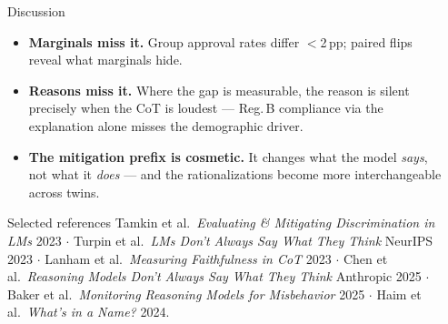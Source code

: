 \documentclass[final]{beamer}
\newlength{\sepwidth}
\newlength{\colwidth}
\newcommand{\separatorcolumn}{\begin{column}{\sepwidth}\end{column}}
\begin{document}
\begin{frame}[t]
\begin{columns}[t]
\begin{column}{\colwidth}
  \begin{block}{Discussion}
    \begin{itemize}
      \item \textbf{Marginals miss it.} Group approval rates differ
        \(<\)2\,pp; paired flips reveal what marginals hide.
      \item \textbf{Reasons miss it.} Where the gap is measurable, the
        reason is silent precisely when the CoT is loudest --- Reg.\,B
        compliance via the explanation alone misses the demographic driver.
      \item \textbf{The mitigation prefix is cosmetic.} It changes what
        the model \emph{says}, not what it \emph{does} --- and the
        rationalizations become more interchangeable across twins.
    \end{itemize}
  \end{block}

  \begin{block}{Selected references}
    \scriptsize
    Tamkin et al.\ \textit{Evaluating \& Mitigating Discrimination in LMs}
    2023 \(\cdot\)
    Turpin et al.\ \textit{LMs Don't Always Say What They Think} NeurIPS
    2023 \(\cdot\)
    Lanham et al.\ \textit{Measuring Faithfulness in CoT} 2023 \(\cdot\)
    Chen et al.\ \textit{Reasoning Models Don't Always Say What They
    Think} Anthropic 2025 \(\cdot\)
    Baker et al.\ \textit{Monitoring Reasoning Models for Misbehavior}
    2025 \(\cdot\)
    Haim et al.\ \textit{What's in a Name?} 2024.
  \end{block}

\end{column}

\separatorcolumn
\end{columns}
\end{frame}
\end{document}
